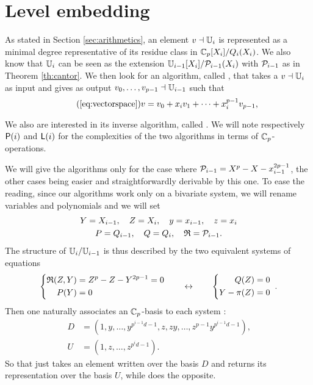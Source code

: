 \section{Level embedding}
\label{sec:level-embedding}

As stated in Section \ref{sec:arithmetics}, an element $v\dashv\mathbb{U}_i$ is
represented as a minimal degree representative of its residue class in
$\mathbb{C}_p[X_i]/Q_i(X_i)$. We also know that $\mathbb{U}_i$ can be seen as the
extension $\mathbb{U}_{i-1}[X_i]/\mathcal{P}_{i-1}(X_i)$ with $\mathcal{P}_{i-1}$ as in
Theorem \ref{th:cantor}. We then look for an algorithm, called
, that takes a $v\dashv\mathbb{U}_i$ as input and gives as output
$v_0,\ldots,v_{p-1}\dashv\mathbb{U}_{i-1}$ such that
\begin{equation}
  \tag{\ref{eq:vectorspace}}
  v = v_0 + x_iv_1 + \cdots + x_i^{p-1}v_{p-1} \text{,}
\end{equation}

We also are interested in its inverse algorithm, called
. We will note respectively $\mathrm{\sf P}(i)$ and $\mathrm{\sf L}(i)$ for
the complexities of the two algorithms in terms of $\mathbb{C}_p$-operations.

We will give the algorithms only for the case where $\mathcal{P}_{i-1} =
X^p - X - x_{i-1}^{2p-1}$, the other cases being easier and
straightforwardly derivable by this one. To ease the reading, since
our algorithms work only on a bivariate system, we will rename
variables and polynomials and we will set
\begin{gather*}
  Y=X_{i-1},\quad Z=X_i,\quad y=x_{i-1},\quad z=x_i \\
  P=Q_{i-1},\quad Q=Q_i,\quad \mathfrak{R}=\mathcal{P}_{i-1}
  \text{.}
\end{gather*}
The structure of $\mathbb{U}_i/\mathbb{U}_{i-1}$ is thus described by the two
equivalent systems of equations
\begin{equation}
  \left\{
  \begin{aligned}
    \mathfrak{R}(Z,Y) &= Z^p - Z - Y^{2p-1} = 0\\
    P(Y)         &= 0
  \end{aligned}
  \right.
  \qquad \leftrightarrow \qquad
  \left\{
  \begin{aligned}
    Q(Z)       &= 0\\
    Y - \pi(Z) &= 0
  \end{aligned}
  \right.    
  \;\text{.}
\end{equation}
Then one naturally associates an $\mathbb{C}_p$-basis to each system :
\begin{equation}
  \label{eq:bases}
  \begin{aligned}
    D &= (1,y,\ldots,y^{p^{i-1}d-1},z,zy,\ldots,z^{p-1}y^{p^{i-1}d-1})\text{,}\\
    U &= (1,z,\ldots,z^{p^id-1})\text{.}
  \end{aligned}
\end{equation}
So that  just takes an element written over the basis $D$
and returns its representation over the basis $U$, while
 does the opposite.

